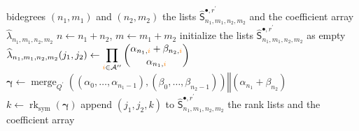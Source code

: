 \documentclass{amsart}
\theoremstyle{definition}
\theoremstyle{remark}
\newcommand{\orange}[1]{{\color{orange}#1}}
\begin{document}
\begin{algorithm}[ht]
\caption{Multiset-placement rank lists for the partially symmetrized shear
shuffle}
\label{alg:gamma_shuffle_sym_rank_arrays}
\begin{algorithmic}[1]
\Require bidegrees $(n_1,m_1)$ and $(n_2,m_2)$
\Ensure the lists
$\widehat{\mathsf{S}}^{\bullet,r^{\prime}}_{n_1,m_1,n_2,m_2}$
and the coefficient array
$\widehat{\lambda}_{n_1,m_1,n_2,m_2}$
\State $n\gets n_1+n_2$, $m\gets m_1+m_2$
\State initialize the lists
$\widehat{\mathsf{S}}^{\bullet,r^{\prime}}_{n_1,m_1,n_2,m_2}$
as empty
        \State
        $\displaystyle
        \widehat{\lambda}_{n_1,m_1,n_2,m_2}(j_1,j_2)
        \gets
        \prod_{\orange{i}\in\mathcal{A}^{\prime\prime}}
        \binom{
            \alpha_{n_1,\orange{i}}
            +
            \beta_{n_2,\orange{i}}
        }{
            \alpha_{n_1,\orange{i}}
        }$
            \State
            $\boldsymbol{\gamma}
            \gets
            \operatorname{merge}_{Q^{\prime}}
            \left(
                (\alpha_0,\ldots,\alpha_{n_1-1}),
                (\beta_0,\ldots,\beta_{n_2-1})
            \right)
            \mathbin{\Vert}
            \left(
                \alpha_{n_1}+\beta_{n_2}
            \right)$
            \State
            $k\gets
            \operatorname{rk}_{\mathrm{sym}}
            (\boldsymbol{\gamma})$
            \State append $(j_1,j_2,k)$ to
            $\widehat{\mathsf{S}}^{
                \bullet,r^{\prime}
            }_{n_1,m_1,n_2,m_2}$
        \EndFor
    \EndFor
\EndFor
\State \Return the rank lists and the coefficient array
\end{algorithmic}
\end{algorithm}
\end{document}
